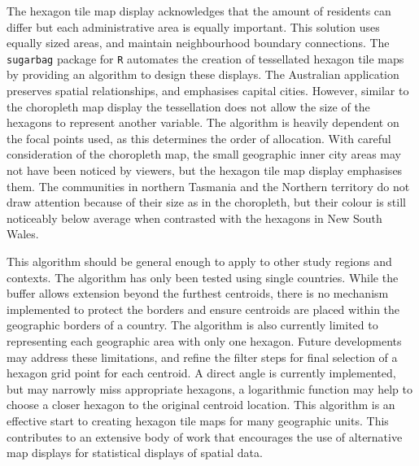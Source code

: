 The hexagon tile map display acknowledges that the amount of residents
can differ but each administrative area is equally important. This
solution uses equally sized areas, and maintain neighbourhood boundary
connections. The \texttt{sugarbag} package for \texttt{R} automates the
creation of tessellated hexagon tile maps by providing an algorithm to
design these displays. The Australian application preserves spatial
relationships, and emphasises capital cities. However, similar to the
choropleth map display the tessellation does not allow the size of the
hexagons to represent another variable. The algorithm is heavily
dependent on the focal points used, as this determines the order of
allocation. With careful consideration of the choropleth map, the small
geographic inner city areas may not have been noticed by viewers, but
the hexagon tile map display emphasises them. The communities in
northern Tasmania and the Northern territory do not draw attention
because of their size as in the choropleth, but their colour is still
noticeably below average when contrasted with the hexagons in New South
Wales.

This algorithm should be general enough to apply to other study regions
and contexts. The algorithm has only been tested using single countries.
While the buffer allows extension beyond the furthest centroids, there
is no mechanism implemented to protect the borders and ensure centroids
are placed within the geographic borders of a country. The algorithm is
also currently limited to representing each geographic area with only
one hexagon. Future developments may address these limitations, and
refine the filter steps for final selection of a hexagon grid point for
each centroid. A direct angle is currently implemented, but may narrowly
miss appropriate hexagons, a logarithmic function may help to choose a
closer hexagon to the original centroid location. This algorithm is an
effective start to creating hexagon tile maps for many geographic units.
This contributes to an extensive body of work that encourages the use of
alternative map displays for statistical displays of spatial data.



\address{%
Stephanie Kobakian\\
Monash University\\%
Department of Econometrics and Business Statistics\\
%
%
%
\\\href{mailto:stephanie.kobakian@monash.edu}{\nolinkurl{stephanie.kobakian@monash.edu}}
}

